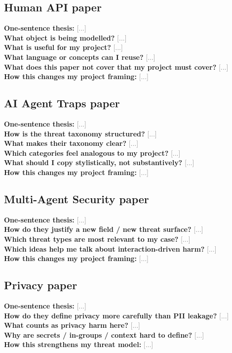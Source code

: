 \documentclass[11pt]{article}
\newcommand{\fillin}[1]{\textcolor{gray}{[#1]}}
\begin{document}
\subsection{Human API paper}
\textbf{One-sentence thesis:} \fillin{...} \\
\textbf{What object is being modelled?} \fillin{...} \\
\textbf{What is useful for my project?} \fillin{...} \\
\textbf{What language or concepts can I reuse?} \fillin{...} \\
\textbf{What does this paper not cover that my project must cover?} \fillin{...} \\
\textbf{How this changes my project framing:} \fillin{...}

\subsection{AI Agent Traps paper}
\textbf{One-sentence thesis:} \fillin{...} \\
\textbf{How is the threat taxonomy structured?} \fillin{...} \\
\textbf{What makes their taxonomy clear?} \fillin{...} \\
\textbf{Which categories feel analogous to my project?} \fillin{...} \\
\textbf{What should I copy stylistically, not substantively?} \fillin{...} \\
\textbf{How this changes my project framing:} \fillin{...}

\subsection{Multi-Agent Security paper}
\textbf{One-sentence thesis:} \fillin{...} \\
\textbf{How do they justify a new field / new threat surface?} \fillin{...} \\
\textbf{Which threat types are most relevant to my case?} \fillin{...} \\
\textbf{Which ideas help me talk about interaction-driven harm?} \fillin{...} \\
\textbf{How this changes my project framing:} \fillin{...}

\subsection{Privacy paper}
\textbf{One-sentence thesis:} \fillin{...} \\
\textbf{How do they define privacy more carefully than PII leakage?} \fillin{...} \\
\textbf{What counts as privacy harm here?} \fillin{...} \\
\textbf{Why are secrets / in-groups / context hard to define?} \fillin{...} \\
\textbf{How this strengthens my threat model:} \fillin{...}
\end{document}
